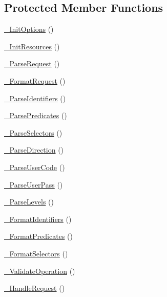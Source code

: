 \subsection*{Protected Member Functions}
\begin{DoxyCompactItemize}
\item 
\hyperlink{class_c_warehouse_wrapper_a8dd1de1d5595647b0999ffa6b658c605}{\-\_\-\-Init\-Options} ()
\item 
\hyperlink{class_c_warehouse_wrapper_ad1b028512dfbd4031ea443fd953bf178}{\-\_\-\-Init\-Resources} ()
\item 
\hyperlink{class_c_warehouse_wrapper_aab6f377ec08fc5f868a5ad65691964f6}{\-\_\-\-Parse\-Request} ()
\item 
\hyperlink{class_c_warehouse_wrapper_a4bd0282949f52ce148b60218c48ddde5}{\-\_\-\-Format\-Request} ()
\item 
\hyperlink{class_c_warehouse_wrapper_a1a4497011e288b0134b1d43b6029914b}{\-\_\-\-Parse\-Identifiers} ()
\item 
\hyperlink{class_c_warehouse_wrapper_a77a135708bb63dad7b6f43b93f38b655}{\-\_\-\-Parse\-Predicates} ()
\item 
\hyperlink{class_c_warehouse_wrapper_aea03fa2eb06da1201acbab5becfccdd2}{\-\_\-\-Parse\-Selectors} ()
\item 
\hyperlink{class_c_warehouse_wrapper_a675e18a0cae0a2050159b608c81e69b1}{\-\_\-\-Parse\-Direction} ()
\item 
\hyperlink{class_c_warehouse_wrapper_aeb1488dd1ab1e8494caff8f920b32ad7}{\-\_\-\-Parse\-User\-Code} ()
\item 
\hyperlink{class_c_warehouse_wrapper_a31f33bdb468cf377df7ac4c6d5496a95}{\-\_\-\-Parse\-User\-Pass} ()
\item 
\hyperlink{class_c_warehouse_wrapper_a687876da8f0dd0d0abb839b2b135ccbe}{\-\_\-\-Parse\-Levels} ()
\item 
\hyperlink{class_c_warehouse_wrapper_a728b298fc1f647792efb5bee38194a8a}{\-\_\-\-Format\-Identifiers} ()
\item 
\hyperlink{class_c_warehouse_wrapper_aa8f737fd107082e69ba1d82c228a9864}{\-\_\-\-Format\-Predicates} ()
\item 
\hyperlink{class_c_warehouse_wrapper_a948c44e335f8a89d50e09d430169533d}{\-\_\-\-Format\-Selectors} ()
\item 
\hyperlink{class_c_warehouse_wrapper_ab9506f24cc7dd6b001991f83bd2b5d55}{\-\_\-\-Validate\-Operation} ()
\item 
\hyperlink{class_c_warehouse_wrapper_a4b909b5b4aba967200ff72e3e6924b5e}{\-\_\-\-Handle\-Request} ()

\end{DoxyCompactItemize}
